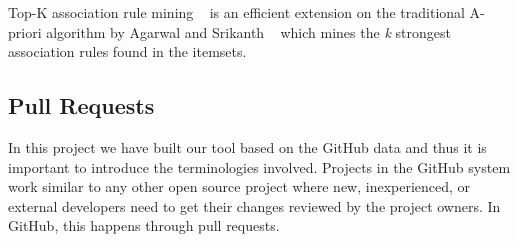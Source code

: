 \begin{table}[htbp]
  \centering
  \caption{A sample snapshot of check-ins in a repository.}
  \hspace{1cm}
  \label{table:checkins_snapshot}
\end{table}


Top-K association rule mining ~\cite{fournier2012mining} is an efficient extension on the traditional A-priori algorithm by Agarwal and Srikanth ~\cite{Agrawal} which mines the \textit{k} strongest association rules found in the itemsets.


\subsection{Pull Requests}


In this project we have built our tool based on the GitHub data and thus it is important to introduce the terminologies involved. Projects in the GitHub system work similar to any other open source project where new, inexperienced, or external developers need to get their changes reviewed by the project owners. In GitHub, this happens through pull requests.\\

